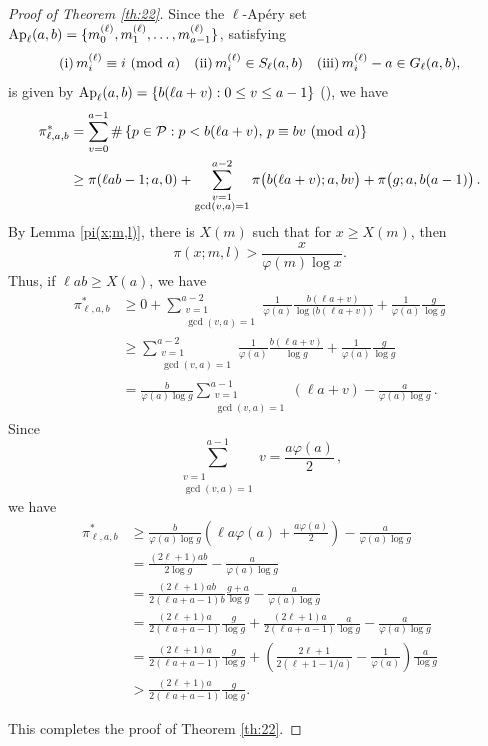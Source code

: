 \documentclass[12pt,a4paper,reqno]{amsart}
\numberwithin{equation}{section}
\def\pmod #1{\ ({\rm{mod}}\ #1)}
\theoremstyle{plain}
\theoremstyle{definition}
\begin{document}
\begin{proof}[Proof of Theorem \ref{th:22}]
Since the $\ell$-Ap\'ery set ${\rm Ap}_\ell(a,b)=\{m_0^{(\ell)},m_1^{(\ell)},\dots,m_{a-1}^{(\ell)}\}$, satisfying
$$
{\rm (i)}\,m_i^{(\ell)}\equiv i\pmod{a}\quad{\rm (ii)}\,m_i^{(\ell)}\in S_{\ell}(a,b)\quad {\rm (iii)}\,m_i^{(\ell)}-a\in G_{\ell}(a,b),  
$$ 
is given by ${\rm Ap}_\ell(a,b)=\{b(\ell a+v):0\le v\le a-1\}$ (\cite[pp.58-59]{Kom2}),
we have 
\begin{align*}  
	\pi^{*}_{\ell,a,b}
	&=\sum_{v=0}^{a-1} \#\left\{p\in\mathcal P: p<b(\ell a+v),\,p\equiv b v\pmod{a}\right\}\\
	&\ge \pi(\ell ab-1;a,0)+\sum_{\substack{v=1\\\gcd(v,a)=1}}^{a-2}\pi\bigl(b(\ell a+v);a,b v\bigr)+\pi\bigl(g;a,b(a-1)\bigr)\,. 
\end{align*} 
By Lemma \ref{pi(x;m,l)}, there is $X(m)$ such that for $x\geq X(m)$, then
$$
\pi(x;m,l)>\frac{x}{\varphi(m)\log x}.
$$
Thus, if $\ell ab\ge X(a)$, we have 
\begin{align*}  
\pi^{*}_{\ell,a,b}
&\ge 0+\sum_{\substack{v=1\\\gcd(v,a)=1}}^{a-2}\frac{1}{\varphi(a)}\frac{b(\ell a+v)}{\log\bigl(b(\ell a+v)\bigr)} +\frac{1}{\varphi(a)}\frac{g}{\log g}\\
&\ge \sum_{\substack{v=1\\\gcd(v,a)=1}}^{a-2}\frac{1}{\varphi(a)}\frac{b(\ell a+v)}{\log g}+\frac{1}{\varphi(a)}\frac{g}{\log g}\\ 
&=\frac{b}{\varphi(a)\log g}\sum_{\substack{v= 1\\ \gcd(v,a)=1}}^{a-1}(\ell a+v)-\frac{a}{\varphi(a)\log g}\,.
\end{align*}
Since 
$$
\sum_{\substack{v=1 \\\gcd(v,a)=1}}^{a-1}v=\frac{a\varphi(a)}{2}\,, 
$$ 
we have 
\begin{align*}  
	\pi^{*}_{\ell,a,b}
	&\ge\frac{b}{\varphi(a)\log g}\left(\ell a \varphi(a)+\frac{a\varphi(a)}{2}\right)-\frac{a}{\varphi(a)\log g}\\ 
	&=\frac{(2\ell+1)ab}{2\log g}-\frac{a}{\varphi(a)\log g}\\
	&=\frac{(2\ell+1)ab}{2(\ell a+a-1)b}\frac{g+a}{\log g}-\frac{a}{\varphi(a)\log g}\\
	&=\frac{(2\ell+1)a}{2(\ell a+a-1)}\frac{g}{\log g}+\frac{(2\ell+1)a}{2(\ell a+a-1)} \frac{a}{\log g}-\frac{a}{\varphi(a)\log g}\\
	&=\frac{(2\ell+1)a}{2(\ell a+a-1)}\frac{g}{\log g}+\left( \frac{2\ell+1}{2(\ell+1-1/a)}-\frac{1}{\varphi(a)} \right)\frac{a}{\log g}\\
	&>\frac{(2\ell+1)a}{2(\ell a+a-1)}\frac{g}{\log g}.
\end{align*} 

This completes the proof of Theorem \ref{th:22}.
\end{proof}
\end{document}
